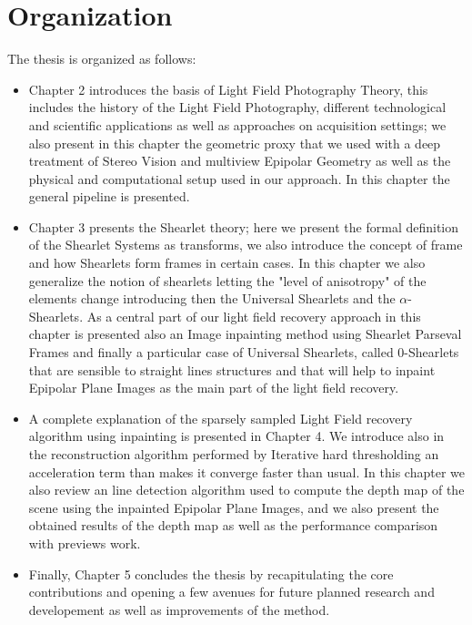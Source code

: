 \section{Organization}

The thesis is organized as follows:

\begin{itemize}
\item Chapter 2 introduces the basis of Light Field Photography Theory, this includes the history of the Light Field Photography, different technological and scientific applications as well as approaches on acquisition settings; we also present in this chapter the geometric proxy that we used with a deep treatment of Stereo Vision and multiview Epipolar Geometry as well as the physical and computational setup used in our approach. In this chapter the general pipeline is presented. 

\item Chapter 3 presents the Shearlet theory; here we present the formal definition of the Shearlet Systems as transforms, we also introduce the concept of frame and how Shearlets form frames in certain cases. In this chapter we also generalize the notion of shearlets letting the "level of anisotropy" of the elements change introducing then the Universal Shearlets and the $\alpha$-Shearlets. As a central part of our light field recovery approach in this chapter is presented also an Image inpainting method using Shearlet Parseval Frames and finally a particular case of Universal Shearlets, called $0$-Shearlets that are sensible to straight lines structures and that will help to inpaint Epipolar Plane Images as the main part of the light field recovery. 

\item A complete explanation of the sparsely sampled Light Field recovery algorithm using inpainting is presented in Chapter 4. We introduce also in the reconstruction algorithm performed by Iterative hard thresholding an acceleration term than makes it converge faster than usual. In this chapter we also review an line detection algorithm used to compute the depth map of the scene using the inpainted Epipolar Plane Images, and we also present the obtained results of the depth map as well as the performance comparison with previews work. 

\item Finally, Chapter 5 concludes the thesis by recapitulating the core contributions and opening a few avenues for future planned research and developement as well as improvements of the method. 
\end{itemize}
